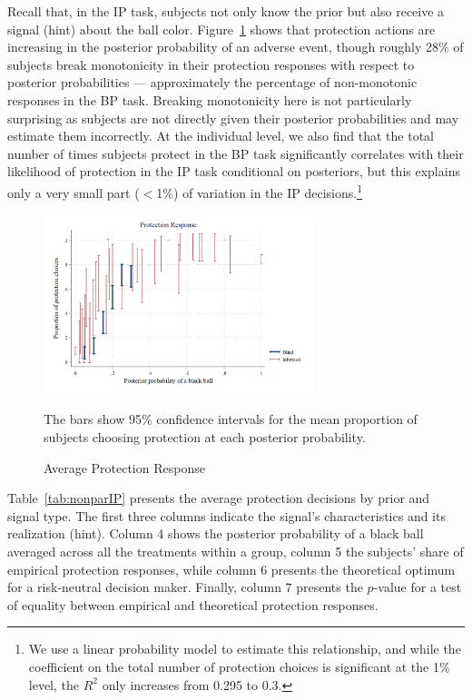\documentclass[12pt,a4paper]{article}
\newcommand{\fnote}[1]{\captionsetup{font={small, it}, aboveskip=0pt} \caption*{#1}}
\begin{document}
Recall that, in the IP task, subjects not only know the prior but also receive a signal (hint) about the ball color. 
Figure~\ref{fig:ProtResponse} shows that protection actions are increasing in the posterior probability of an adverse event, though roughly 28\% of subjects break monotonicity in their protection responses with respect to posterior probabilities --- approximately the percentage of non-monotonic responses in the BP task.  Breaking monotonicity here is not particularly surprising as subjects are not directly given their posterior probabilities and may estimate them incorrectly. At the individual level, we also find that the total number of times subjects protect in the BP task significantly correlates with their likelihood of protection in the IP task conditional on posteriors, but this explains only a very small part ($<$1\%) of variation in the IP decisions.\footnote{We use a linear probability model to estimate this relationship, and while the coefficient on the total number of protection choices is significant at the 1\% level, the $R^2$ only increases from 0.295 to 0.3.} 


\begin{figure}[H]
\centering
\caption{Average Protection Response} \label{fig:ProtResponse}
  \includegraphics[width=0.7\textwidth]{Graphs/ip_response_comp.png}
\fnote{The bars show 95\% confidence intervals for the mean proportion of subjects choosing protection at each posterior probability.}
\end{figure}

Table~\ref{tab:nonparIP} presents the average protection decisions by prior and signal type. The first three columns indicate the signal's characteristics and its realization (hint). Column 4 shows the posterior probability of a black ball averaged across all the treatments within a group, column 5 the subjects' share of empirical protection responses, while column 6 presents the theoretical optimum for a risk-neutral decision maker. Finally, column 7 presents the $p$-value for a test of equality between empirical and theoretical protection responses.
\end{document}
